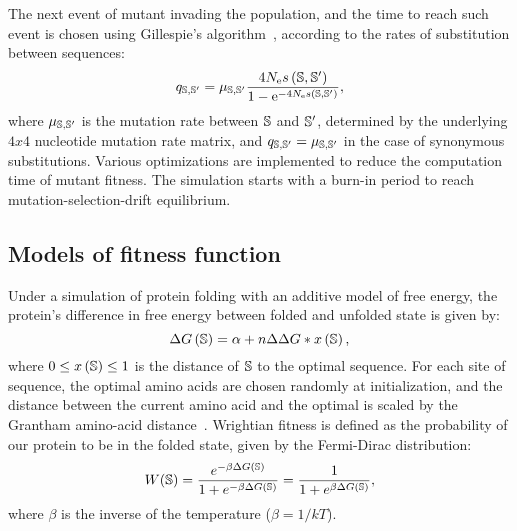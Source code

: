The next event of mutant invading the population, and the time to reach such event is chosen using Gillespie's algorithm~\citep{Gillespie1977}, according to the rates of substitution between sequences:
\begin{equation}
    q_{\mathbb{S}, \mathbb{S}'} = \mu_{\mathbb{S}, \mathbb{S}'} \dfrac{4 N_{\text{e}} s \left( \mathbb{S},\mathbb{S}'\right)}{1 - \text{e}^{-4 N_{\text{e}} s \left( \mathbb{S},\mathbb{S}'\right)}},
\end{equation}
where $\mu_{\mathbb{S}, \mathbb{S}'}$ is the mutation rate between $\mathbb{S}$ and $\mathbb{S}'$, determined by the underlying $4x4$ nucleotide mutation rate matrix, and ${q_{\mathbb{S}, \mathbb{S}'}} = \mu_{\mathbb{S}, \mathbb{S}'}$ in the case of synonymous substitutions.
Various optimizations are implemented to reduce the computation time of mutant fitness.
The simulation starts with a burn-in period to reach mutation-selection-drift equilibrium.

\subsection{Models of fitness function}
\label{MatMet:folding}

Under a simulation of protein folding with an additive model of free energy, the protein's difference in free energy between folded and unfolded state is given by:
\begin{equation*}
    \Delta G\left(\mathbb{S}\right) = \alpha + n \Delta \Delta G * x\left(\mathbb{S}\right),
\end{equation*}
where $0 \leq x\left(\mathbb{S}\right) \leq 1$ is the distance of $\mathbb{S}$ to the optimal sequence.
For each site of sequence, the optimal amino acids are chosen randomly at initialization, and the distance between the current amino acid and the optimal is scaled by the Grantham amino-acid distance~\citep{Grantham1974}.
Wrightian fitness is defined as the probability of our protein to be in the folded state, given by the Fermi-Dirac distribution:
\begin{equation}
    W (\mathbb{S}) = \dfrac{e^{-\beta \Delta G\left(\mathbb{S}\right) }}{1 + e^{-\beta \Delta G\left(\mathbb{S}\right) }} = \dfrac{1}{1 + e^{\beta \Delta G\left(\mathbb{S}\right) }},
\end{equation}
where $\beta$ is the inverse of the temperature ($\beta=1/kT$).

